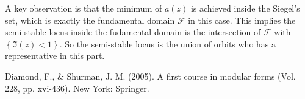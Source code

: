 \documentclass[12pt]{article} %
\begin{document}
    A key observation is that the minimum of $a(z)$ is achieved inside the Siegel's set, which is exactly the fundamental domain $\mathcal{F}$ in this case. This implies the semi-stable locus inside the fudamental domain
    is the intersection of $\mathcal{F}$ with $\left\lbrace \Im(z)<1\right\rbrace$. So the semi-stable locus is the union of orbits who has a representative in this part.

\begin{thebibliography}{}
      Diamond, F., \& Shurman, J. M. (2005). A first course in modular forms (Vol. 228, pp. xvi-436). New York: Springer.
\end{thebibliography}
\end{document}
